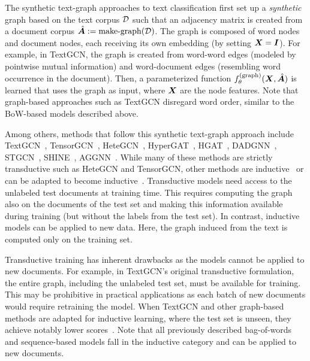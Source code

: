 The synthetic text-graph approaches to text classification first set up a \emph{synthetic} graph based on the text corpus $\mathcal{D}$ such that an adjacency matrix is created from a document corpus $\hat{{\bm{A}}} := \operatorname{make-graph}(\mathcal{D})$.
The graph is composed of word nodes and document nodes, each receiving its own embedding (by setting ${\bm{X}} ={\bm{I}}$).
For example, in TextGCN, the graph is created from word-word edges (modeled by pointwise mutual information) and word-document edges (resembling word occurrence in the document).
Then, a parameterized function $f_\theta^{(\mathrm{graph})}({\bm{X}}, \hat{{\bm{A}}})$ is learned that uses the graph as input, where ${\bm{X}}$ are the node features. 
Note that graph-based approaches such as TextGCN disregard word order, similar to the BoW-based models described above.

Among others, methods that follow this synthetic text-graph approach include
TextGCN~\cite{DBLP:conf/aaai/YaoM019},
TensorGCN~\cite{DBLP:conf/aaai/LiuYZWL20},
Hete\-GCN~\cite{DBLP:conf/wsdm/RageshSIBL21},
HyperGAT~\cite{DBLP:conf/emnlp/DingWLLL20}, 
HGAT~\cite{DBLP:journals/tois/YangHSJLN21},
DADGNN~\cite{DBLP:conf/aaai/LiuYZWL20}, 
STGCN~\cite{stgcn},
SHINE~\cite{DBLP:conf/emnlp/WangWYD21},
AGGNN~\cite{aggnn}.
While many of these methods are strictly transductive such as HeteGCN and TensorGCN, other methods are 
inductive~\cite{DBLP:conf/coling/HuangCC22,induct-gcn,texting_acl2020,DBLP:conf/emnlp/HuangMLZW19} or can be adapted to become inductive~\cite{DBLP:conf/wsdm/RageshSIBL21}.
Transductive models need access to the unlabeled test documents at training time. 
This requires computing the graph also on the documents of the test set and making this information available during training (but without the labels from the test set).
In contrast, inductive models can be applied to new data. 
Here, the graph induced from the text is computed only on the training set.

Transductive training has inherent drawbacks as the models cannot be applied to new documents.
For example, in TextGCN's original transductive formulation, the entire graph, including the unlabeled test set, must be available for training.
This may be prohibitive in practical applications as each batch of new documents would require retraining the model.
When TextGCN and other graph-based methods are adapted for inductive learning, where the test set is unseen, they achieve notably lower scores~\cite{DBLP:conf/wsdm/RageshSIBL21}. 
Note that all previously described bag-of-words and sequence-based models fall in the inductive category and can be applied to new documents.

